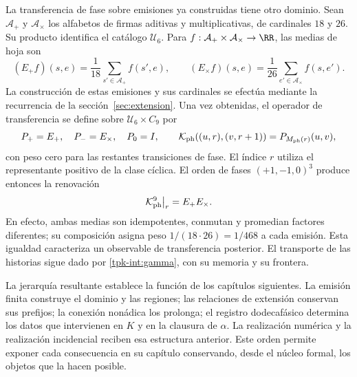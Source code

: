 La transferencia de fase sobre emisiones ya construidas tiene otro
dominio. Sean \(\mathcal A_+\) y \(\mathcal A_\times\) los
alfabetos de firmas aditivas y multiplicativas, de cardinales \(18\)
y \(26\). Su producto identifica el catálogo \(\mathcal U_6\).
Para \(f:\mathcal A_+\times\mathcal A_\times\to\RR\),
las medias de hoja son
\[
 (E_+f)(s,e)=\frac1{18}\sum_{s'\in\mathcal A_+}f(s',e),\qquad
 (E_\times f)(s,e)=\frac1{26}\sum_{e'\in\mathcal A_\times}f(s,e').
\]
La construcción de estas emisiones y sus cardinales se efectúa mediante
la recurrencia de la sección~\ref{sec:extension}. Una vez obtenidas,
el operador de transferencia se define sobre
\(\mathcal U_6\times C_9\) por
\[
 P_+=E_+,\quad P_-=E_\times,\quad P_0=I,\qquad
 \mathcal K_{\rm ph}((u,r),(v,r+1))=P_{M_{\rm ph}(r)}(u,v),
\]
con peso cero para las restantes transiciones de fase. El índice
\(r\) utiliza el representante positivo de la clase cíclica.
El orden de fases \((+1,-1,0)^3\) produce entonces la renovación
\[
 \mathcal K_{\rm ph}^{9}\big|_r=E_+E_\times.
\]
En efecto, ambas medias son idempotentes, conmutan y promedian factores
diferentes; su composición asigna peso \(1/(18\cdot26)=1/468\)
a cada emisión. Esta igualdad caracteriza un observable de transferencia
posterior. El transporte de las historias sigue dado por
\eqref{tpk-int:gamma}, con su memoria y su frontera.

La jerarquía resultante establece la función de los capítulos siguientes.
La emisión finita construye el dominio y las regiones; las relaciones de
extensión conservan sus prefijos; la conexión nonádica los prolonga; el
registro dodecafásico determina los datos que intervienen en \(K\) y
en la clausura de \(\alpha\). La realización numérica y la realización
incidencial reciben esa estructura anterior. Este orden permite exponer
cada consecuencia en su capítulo conservando, desde el núcleo formal,
los objetos que la hacen posible.
